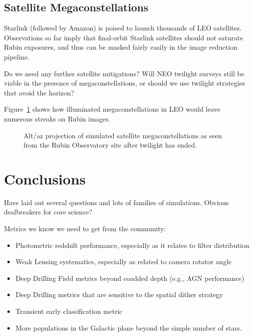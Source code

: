 \subsection{Satellite Megaconstellations}

Starlink (followed by Amazon) is poised to launch thousands of LEO satellites. Observations so far imply that final-orbit Starlink satellites should not saturate Rubin exposures, and thus can be masked fairly easily in the image reduction pipeline. 

Do we need any further satellite mitigations? Will NEO twilight surveys still be viable in the presence of megaconstellations, or should we use twilight strategies that avoid the horizon?

Figure~\ref{fig:megasat} shows how illuminated megaconstellations in LEO would leave numerous streaks on Rubin images.

\begin{figure}
\label{fig:megasat}
\caption{Alt/az projection of simulated satellite megaconstellations as seen from the Rubin Observatory site after twilight has ended. } 
\end{figure}



\section{Conclusions}

Have laid out several questions and lots of families of simulations. Obvious dealbreakers for core science? 

Metrics we know we need to get from the community:
\begin{itemize}
    \item{Photometric redshift performance, especially as it relates to filter distribution}
    \item{Weak Lensing systematics, especially as related to camera rotator angle}
    \item{Deep Drilling Field metrics beyond coadded depth (e.g., AGN performance)}
    \item{Deep Drilling metrics that are sensitive to the spatial dither strategy}
    \item{Transient early classification metric}
    \item{More populations in the Galactic plane beyond the simple number of stars.}
\end{itemize}

